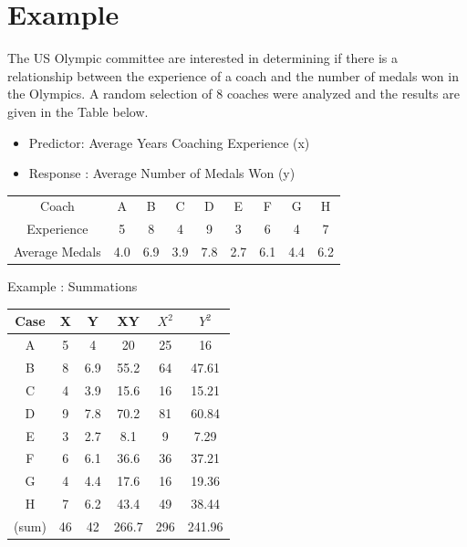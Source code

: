 \documentclass[]{report}
\begin{document}

\section{Example}

The US Olympic committee are interested in determining if there is a relationship between the experience of a coach and the number of medals won in the Olympics. A random selection of 8 coaches were analyzed and the results are given in the Table below.
\begin{itemize}
	\item Predictor: Average Years Coaching Experience (x)	
	\item Response : Average Number of Medals Won (y)
\end{itemize}
\begin{center}
	
	\begin{tabular}{|c|c|c|c|c|c|c|c|c|}
		\hline
		Coach & A & B & C & D & E & F & G & H \\
		Experience & 5 & 8 & 4 & 9 & 3 & 6 & 4 & 7\\
		Average Medals &4.0 & 6.9&3.9&7.8&2.7&6.1&4.4&6.2\\
		\hline
	\end{tabular}
\end{center}




{Example : Summations}
\begin{center}
	\begin{tabular}{|c|c|c|c|c|c|}
		\hline
		Case &	X	&	Y	&	XY	&	$X^2$	&	$Y^2$	\\  \hline
		A	&	5	&	4	&	20	&	25	&	16	\\
		B	&	8	&	6.9	&	55.2	&	64	&	47.61	\\
		C	&	4	&	3.9	&	15.6	&	16	&	15.21	\\
		D	&	9	&	7.8	&	70.2	&	81	&	60.84	\\
		E	&	3	&	2.7	&	8.1	&	9	&	7.29	\\
		F	&	6	&	6.1	&	36.6	&	36	&	37.21	\\
		G	&	4	&	4.4	&	17.6	&	16	&	19.36	\\
		H	&	7	&	6.2	&	43.4	&	49	&	38.44	\\ \hline
		(sum)	&	46	&	42	&	266.7	&	296	&	241.96	\\ \hline
	\end{tabular}
\end{center}
\end{document}
